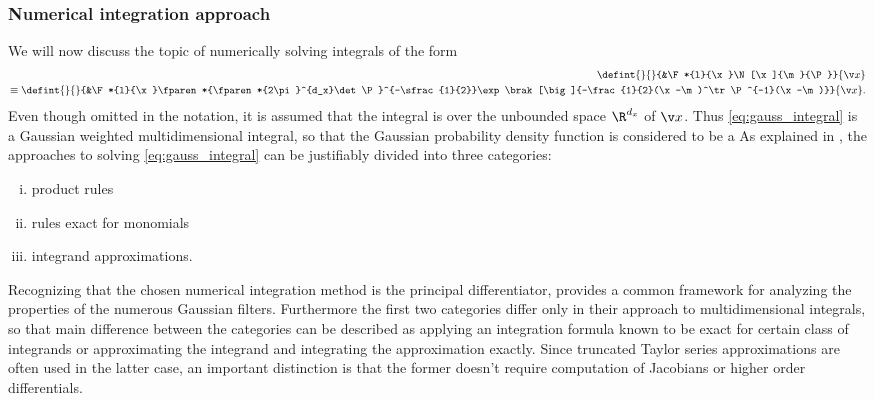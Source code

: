 \subsubsection{Numerical integration approach}
 We will now discuss the topic of numerically solving integrals of the form
 \begin{align}
	\defint{}{}{&\F*{l}{\x}\N[\x]{\m}{\P}}{\x} \nonumber\\
	\equiv\defint{}{}{&\F*{l}{\x}\fparen*{\fparen*{2\pi}^{d_x}\det\P}^{-\sfrac{1}{2}}\exp\brak[\big]{-\frac{1}{2}(\x-\m)^\tr\P^{-1}(\x-\m)}}{\x}.
	\label{eq:gauss_integral}
\end{align}%
%
Even though omitted in the notation, it is assumed that the integral
is over the unbounded space $\R^{d_x}$ of $\x$. Thus \eqref{eq:gauss_integral}
is a Gaussian weighted multidimensional integral, so that the Gaussian
probability density function is considered to be a 
As explained in \textcite{Wu2006}, the approaches to solving \eqref{eq:gauss_integral}
can be justifiably divided into three categories: 
\begin{enumerate}[i)] \addtolength{\leftskip}{.5cm} \itemsep1pt \parskip0pt 
  \item product rules
  \item rules exact for monomials
  \item integrand approximations.
\end{enumerate}
Recognizing that the chosen numerical integration method is the principal differentiator, provides a 
common framework for analyzing the properties of the numerous Gaussian filters.
Furthermore the first two categories differ only in their approach to multidimensional integrals,
so that main difference between the categories can be described
as applying an integration formula known to be exact for certain class of integrands
or approximating the integrand and integrating the approximation exactly.
Since truncated Taylor series approximations are often used in the latter case, an important distinction
is that the former doesn't require computation of Jacobians or higher order differentials. 

